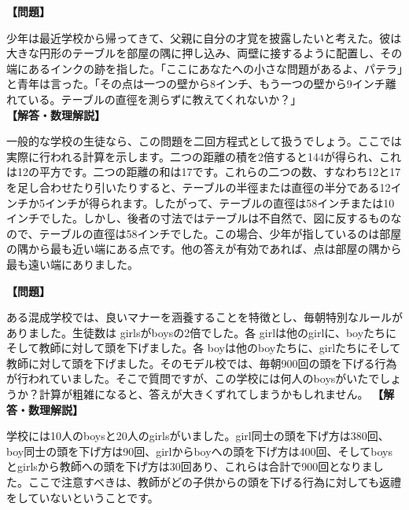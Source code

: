 \documentclass[10pt,a4paper,oneside,openany]{ltjsbook}
\begin{document}
\begin{tcolorbox}[colback=softblue,colframe=primaryblue,title=\textbf{第 97 問：テーブル上の点 （原題: THE SPOT ON THE TABLE.）},arc=2mm,boxrule=1pt,breakable]
\textbf{【問題】}\par\vspace{0.3em}
少年は最近学校から帰ってきて、父親に自分の才覚を披露したいと考えた。彼は大きな円形のテーブルを部屋の隅に押し込み、両壁に接するように配置し、その端にあるインクの跡を指した。「ここにあなたへの小さな問題があるよ、パテラ」と青年は言った。「その点は一つの壁から8インチ、もう一つの壁から9インチ離れている。テーブルの直徑を測らずに教えてくれないか？」
\tcblower
\textbf{【解答・数理解説】}\par\vspace{0.3em}
一般的な学校の生徒なら、この問題を二回方程式として扱うでしょう。ここでは実際に行われる計算を示します。二つの距離の積を2倍すると144が得られ、これは12の平方です。二つの距離の和は17です。これらの二つの数、すなわち12と17を足し合わせたり引いたりすると、テーブルの半徑または直徑の半分である12インチか5インチが得られます。したがって、テーブルの直徑は58インチまたは10インチでした。しかし、後者の寸法ではテーブルは不自然で、図に反するものなので、テーブルの直徑は58インチでした。この場合、少年が指しているのは部屋の隅から最も近い端にある点です。他の答えが有効であれば、点は部屋の隅から最も遠い端にありました。
\end{tcolorbox}

\begin{tcolorbox}[colback=softblue,colframe=primaryblue,title=\textbf{第 98 問：学術的な禮儀 （原題: ACADEMIC COURTESIES.）},arc=2mm,boxrule=1pt,breakable]
\textbf{【問題】}\par\vspace{0.3em}
ある混成学校では、良いマナーを涵養することを特徴とし、毎朝特別なルールがありました。生徒数は girlsがboysの2倍でした。各 girlは他のgirlに、boyたちにそして教師に対して頭を下げました。各 boyは他のboyたちに、girlたちにそして教師に対して頭を下げました。そのモデル校では、毎朝900回の頭を下げる行為が行われていました。そこで質問ですが、この学校には何人のboysがいたでしょうか？計算が粗雑になると、答えが大きくずれてしまうかもしれません。
\tcblower
\textbf{【解答・数理解説】}\par\vspace{0.3em}
学校には10人のboysと20人のgirlsがいました。girl同士の頭を下げ方は380回、boy同士の頭を下げ方は90回、girlからboyへの頭を下げ方は400回、そしてboysとgirlsから教師への頭を下げ方は30回あり、これらは合計で900回となりました。ここで注意すべきは、教師がどの子供からの頭を下げる行為に対しても返禮をしていないということです。
\end{tcolorbox}
\end{document}
